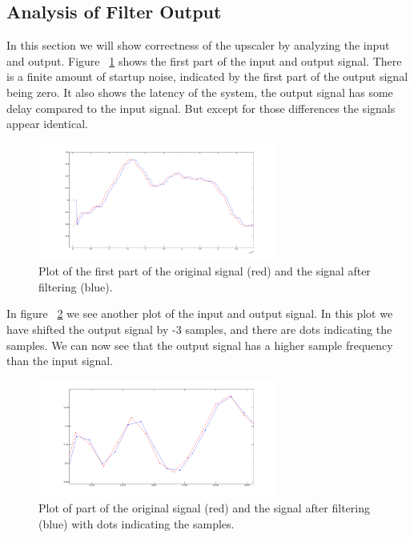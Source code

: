 \subsection{Analysis of Filter Output }
\label{sec:analysis}
In this section we will show correctness of the upscaler by analyzing the input and output. Figure ~\ref{fig:plot1} shows the first part of the input and output signal. There is a finite amount of startup noise, indicated by the first part of the output signal being zero. It also shows the latency of the system, the output signal has some delay compared to the input signal. But except for those differences the signals appear identical.
\begin{figure}
\begin{center}
\includegraphics[width=0.7\textwidth]{images/plot1.png}
\caption{Plot of the first part of the original signal (red) and the signal after filtering (blue).}
\label{fig:plot1}
\end{center}
\end{figure}
In figure ~\ref{fig:plot2} we see another plot of the input and output signal. In this plot we have shifted the output signal by -3 samples, and there are dots indicating the samples. We can now see that the output signal has a higher sample frequency than the input signal. 
\begin{figure}
\begin{center}
\includegraphics[width=0.7\textwidth]{images/plot2.png}
\caption{Plot of part of the original signal (red) and the signal after filtering (blue) with dots indicating the samples.}
\label{fig:plot2}
\end{center}
\end{figure}

